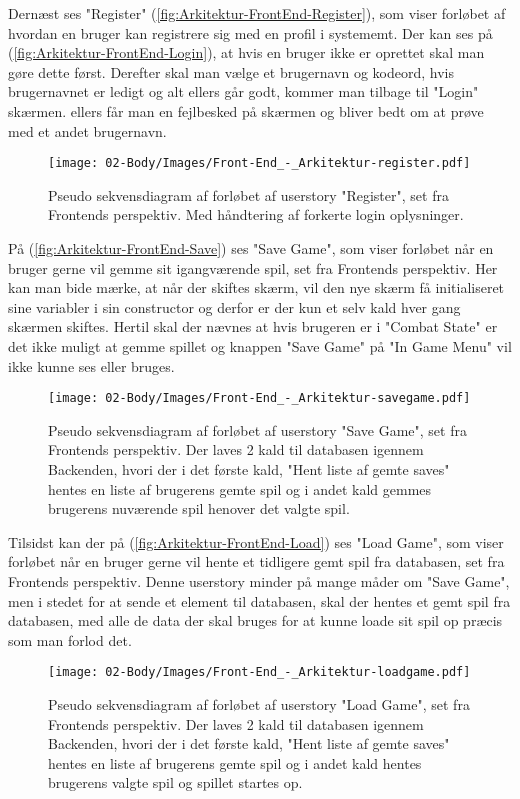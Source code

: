 \noindent Dernæst ses "Register" (\autoref{fig:Arkitektur-FrontEnd-Register}), som viser forløbet af hvordan en bruger kan registrere sig med en profil i systememt. Der kan ses på (\autoref{fig:Arkitektur-FrontEnd-Login}), at hvis en bruger ikke er oprettet skal man gøre dette først. Derefter skal man vælge et brugernavn og kodeord, hvis brugernavnet er ledigt og alt ellers går godt, kommer man tilbage til "Login" skærmen. ellers får man en fejlbesked på skærmen og bliver bedt om at prøve med et andet brugernavn.\\

\begin{figure}[h]
\centering
\texttt{[image: 02-Body/Images/Front-End\_-\_Arkitektur-register.pdf]}
\caption{Pseudo sekvensdiagram af forløbet af userstory "Register", set fra Frontends perspektiv. Med håndtering af forkerte login oplysninger.}
\label{fig:Arkitektur-FrontEnd-Register}
\end{figure}

\noindent På (\autoref{fig:Arkitektur-FrontEnd-Save}) ses "Save Game", som viser forløbet når en bruger gerne vil gemme sit igangværende spil, set fra Frontends perspektiv. Her kan man bide mærke, at når der skiftes skærm, vil den nye skærm få initialiseret sine variabler i sin constructor og derfor er der kun et selv kald hver gang skærmen skiftes.
Hertil skal der nævnes at hvis brugeren er i "Combat State" er det ikke muligt at gemme spillet og knappen "Save Game" på "In Game Menu" vil ikke kunne ses eller bruges.\\

\begin{figure}[h]
\centering
\texttt{[image: 02-Body/Images/Front-End\_-\_Arkitektur-savegame.pdf]}
\caption{Pseudo sekvensdiagram af forløbet af userstory "Save Game", set fra Frontends perspektiv. Der laves 2 kald til databasen igennem Backenden, hvori der i det første kald,  "Hent liste af gemte saves" hentes en liste af brugerens gemte spil og i andet kald gemmes brugerens nuværende spil henover det valgte spil.}
\label{fig:Arkitektur-FrontEnd-Save}
\end{figure}

\noindent Tilsidst kan der på (\autoref{fig:Arkitektur-FrontEnd-Load}) ses "Load Game", som viser forløbet når en bruger gerne vil hente et tidligere gemt spil fra databasen, set fra Frontends perspektiv. Denne userstory minder på mange måder om "Save Game", men i stedet for at sende et element til databasen, skal der hentes et gemt spil fra databasen, med alle de data der skal bruges for at kunne loade sit spil op præcis som man forlod det. \\

\begin{figure}[h]
\centering
\texttt{[image: 02-Body/Images/Front-End\_-\_Arkitektur-loadgame.pdf]}
\caption{Pseudo sekvensdiagram af forløbet af userstory "Load Game", set fra Frontends perspektiv. Der laves 2 kald til databasen igennem Backenden, hvori der i det første kald,  "Hent liste af gemte saves" hentes en liste af brugerens gemte spil og i andet kald hentes  brugerens valgte spil og spillet startes op.}
\label{fig:Arkitektur-FrontEnd-Load}
\end{figure}

\newpage